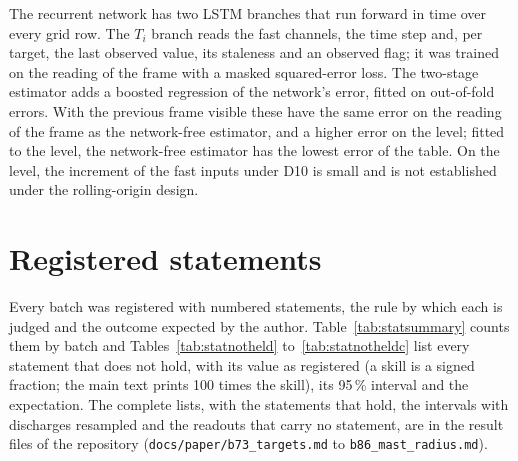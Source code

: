 \documentclass[11pt,a4paper]{article}
\newcommand{\Ti}{\ensuremath{T_i}}
\begin{document}
\begin{table}[tbp]
  \centering
  \caption{\CapLadderDesigns}
  \label{tab:ladderdesigns}
  \TabLadderDesigns
\end{table}

The recurrent network has two LSTM branches that run forward in time over every grid
row. The \Ti{} branch reads the fast channels, the time step and, per target, the last
observed value, its staleness and an observed flag; it was trained on the reading of the
frame with a masked squared-error loss. The two-stage estimator adds a boosted regression
of the network's error, fitted on out-of-fold errors. With the previous frame visible
these have the same error on the reading of the frame as the network-free estimator, and
a higher error on the level; fitted to the level, the network-free estimator has the
lowest error of the table. On the level, the increment of the fast inputs under D10 is
small and is not established under the rolling-origin design.

\begin{table}[tbp]
  \centering
  \caption{\CapDten}
  \label{tab:dten}
  \TabDten
\end{table}

\begin{table}[tbp]
  \centering
  \caption{\CapNetwork}
  \label{tab:network}
  \TabNetwork
\end{table}

\section{Registered statements}
\label{sec:sstatements}

Every batch was registered with numbered statements, the rule by which each is judged
and the outcome expected by the author. Table~\ref{tab:statsummary} counts them by batch
and Tables~\ref{tab:statnotheld} to~\ref{tab:statnotheldc} list every statement that does not hold, with its value
as registered (a skill is a signed fraction; the main text prints 100 times the skill),
its 95\,\% interval and the expectation. The complete lists, with the statements that
hold, the intervals with discharges resampled and the readouts that carry no statement,
are in the result files of the repository (\texttt{docs/paper/b73\_targets.md} to
\texttt{b86\_mast\_radius.md}).

\begin{table}[tbp]
  \centering
  \caption{\CapStatSummary}
  \label{tab:statsummary}
  \TabStatSummary
\end{table}
\end{document}

